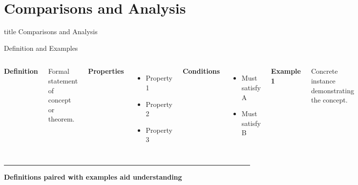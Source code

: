 \documentclass[8pt,aspectratio=169]{beamer}
\newcommand{\bottomnote}[1]{%
\vfill
\vspace{-2mm}
\textcolor{mllavender2}{\rule{\textwidth}{0.4pt}}
\vspace{1mm}
\footnotesize
\textbf{#1}
}
\begin{document}
\section{Comparisons and Analysis}

\begin{frame}[t]
\vfill
\centering
\begin{beamercolorbox}[sep=8pt,center]{title}
\Large Comparisons and Analysis\par
\end{beamercolorbox}
\vfill
\end{frame}

\begin{frame}[t]{Definition and Examples}
\begin{columns}[T]
\textbf{Definition}

Formal statement of concept or theorem.

\vspace{0.5em}
\textbf{Properties}
\begin{itemize}
\item Property 1
\item Property 2
\item Property 3
\end{itemize}

\vspace{0.5em}
\textbf{Conditions}
\begin{itemize}
\item Must satisfy A
\item Must satisfy B
\end{itemize}

\textbf{Example 1}

Concrete instance demonstrating the concept.

Details:
\begin{itemize}
\item Specific value: 42
\item Result: \textcolor{mlgreen}{Valid}
\end{itemize}

\vspace{0.5em}
\textbf{Example 2}

Another instance showing different aspect.

Details:
\begin{itemize}
\item Specific value: -5
\item Result: \textcolor{mlorange}{Invalid}
\end{itemize}
\end{columns}

\bottomnote{Definitions paired with examples aid understanding}
\end{frame}
\end{document}
